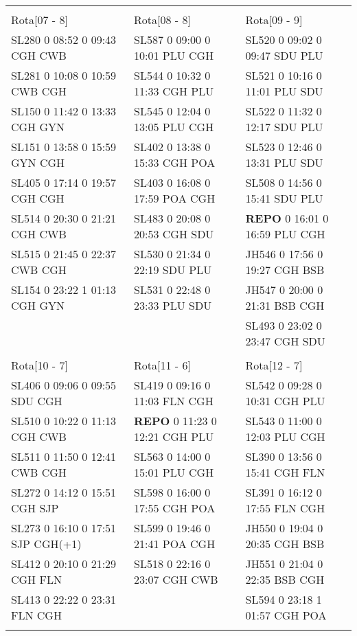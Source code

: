 \begin{scriptsize}
\begin{longtable}{l l l}
& & \\

Rota[07 - 8]  & Rota[08 - 8]  & Rota[09 - 9] \\
SL280  0 08:52 0 09:43 CGH CWB & SL587  0 09:00 0 10:01 PLU CGH & SL520  0 09:02 0 09:47 SDU PLU\\
SL281  0 10:08 0 10:59 CWB CGH & SL544  0 10:32 0 11:33 CGH PLU & SL521  0 10:16 0 11:01 PLU SDU\\
SL150  0 11:42 0 13:33 CGH GYN & SL545  0 12:04 0 13:05 PLU CGH & SL522  0 11:32 0 12:17 SDU PLU\\
SL151  0 13:58 0 15:59 GYN CGH & SL402  0 13:38 0 15:33 CGH POA & SL523  0 12:46 0 13:31 PLU SDU\\
SL405  0 17:14 0 19:57 CGH CGH & SL403  0 16:08 0 17:59 POA CGH & SL508  0 14:56 0 15:41 SDU PLU\\
SL514  0 20:30 0 21:21 CGH CWB & SL483  0 20:08 0 20:53 CGH SDU & \textbf{REPO}   0 16:01 0 16:59 PLU CGH\\
SL515  0 21:45 0 22:37 CWB CGH & SL530  0 21:34 0 22:19 SDU PLU & JH546  0 17:56 0 19:27 CGH BSB\\
SL154  0 23:22 1 01:13 CGH GYN & SL531  0 22:48 0 23:33 PLU SDU & JH547  0 20:00 0 21:31 BSB CGH\\
 &  & SL493  0 23:02 0 23:47 CGH SDU\\


& & \\

Rota[10 - 7]  & Rota[11 - 6]  & Rota[12 - 7] \\
SL406  0 09:06 0 09:55 SDU CGH & SL419  0 09:16 0 11:03 FLN CGH & SL542  0 09:28 0 10:31 CGH PLU\\
SL510  0 10:22 0 11:13 CGH CWB & \textbf{REPO}   0 11:23 0 12:21 CGH PLU & SL543  0 11:00 0 12:03 PLU CGH\\
SL511  0 11:50 0 12:41 CWB CGH & SL563  0 14:00 0 15:01 PLU CGH & SL390  0 13:56 0 15:41 CGH FLN\\
SL272  0 14:12 0 15:51 CGH SJP & SL598  0 16:00 0 17:55 CGH POA & SL391  0 16:12 0 17:55 FLN CGH\\
SL273  0 16:10 0 17:51 SJP CGH(+1) & SL599  0 19:46 0 21:41 POA CGH & JH550  0 19:04 0 20:35 CGH BSB\\
SL412  0 20:10 0 21:29 CGH FLN & SL518  0 22:16 0 23:07 CGH CWB & JH551  0 21:04 0 22:35 BSB CGH\\
SL413  0 22:22 0 23:31 FLN CGH &  & SL594  0 23:18 1 01:57 CGH POA\\

& & \\


\end{longtable}
\end{scriptsize}
